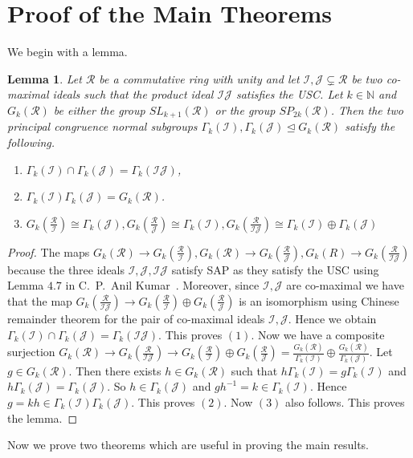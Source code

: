\documentclass[12pt]{amsart}
\newcommand{\sbnq}{\subsetneq}
\newcommand{\mbb}{\mathbb}
\newcommand{\mcl}{\mathcal}
\newcommand{\lra}{\longrightarrow}
\newcommand{\I}{\mcl I}
\newcommand{\N}{\mbb N}
\newcommand{\R}{\mcl R}
\theoremstyle{plain}
\newtheorem{lemma}[theorem]{Lemma}
\theoremstyle{definition}
\theoremstyle{remark}
\numberwithin{equation}{section}
\begin{document}
\section{\bf{Proof of the Main Theorems}}
We begin with a lemma.
\begin{lemma}
	\label{lemma:Complement}
Let $\R$ be a commutative ring with unity and let $\I,\mcl{J}\sbnq \R$ be two co-maximal ideals such that the product ideal $\I\mcl{J}$ satisfies the USC. Let $k\in \N$ and $G_k(\R)$ be either the group $SL_{k+1}(\R)$ or the group $SP_{2k}(\R)$. Then the two principal congruence normal subgroups $\Gamma_k(\I),\Gamma_k(\mcl{J}) \trianglelefteq  G_k(\R)$ satisfy the following.
\begin{enumerate}
\item $\Gamma_k(\I)\cap \Gamma_k(\mcl{J})=\Gamma_k(\I\mcl{J})$,
\item $\Gamma_k(\mcl{I})\Gamma_k(\mcl{J})=G_k(\R)$.
\item $G_k(\frac{\R}{\I})\cong \Gamma_k(\mcl{J}),G_k(\frac{\R}{\mcl{J}})\cong \Gamma_k(\I),G_k(\frac{\R}{\I\mcl{J}})\cong \Gamma_k(\I)\oplus \Gamma_k(\mcl{J})$
\end{enumerate}
\end{lemma}
\begin{proof}
The maps $G_k(\R)\lra G_k(\frac{\R}{\I}),G_k(\R)\lra G_k(\frac{\R}{\mcl{J}}),G_k(R)\lra G_k(\frac{\R}{\I\mcl{J}})$ because the three ideals $\I,\mcl{J},\I\mcl{J}$ satisfy SAP as they satisfy the USC using Lemma $4.7$ in C.~P.~Anil Kumar~\cite{CPAKII}. Moreover, since $\I,\mcl{J}$ are co-maximal we have that the map $G_k(\frac{\R}{\I\mcl{J}})\lra G_k(\frac{\R}{\mcl{I}})\oplus G_k(\frac{\R}{\mcl{J}})$ is an isomorphism using Chinese remainder theorem for the pair of co-maximal ideals $\I,\mcl{J}$. Hence we obtain $\Gamma_k(\I)\cap \Gamma_k(\mcl{J})=\Gamma_k(\I\mcl{J})$. This proves $(1)$. Now we have a composite surjection $G_k(\R)\lra G_k(\frac{\R}{\I\mcl{J}}) \lra G_k(\frac{\R}{\mcl{I}})\oplus G_k(\frac{\R}{\mcl{J}})=\frac{G_k(\R)}{\Gamma_k(\I)}\oplus \frac{G_k(\R)}{\Gamma_k(\mcl{J})}$. Let $g\in G_k(\R)$. Then there exists $h\in G_k(\R)$ such that $h\Gamma_k(\I)=g\Gamma_k(\I)$ and $h\Gamma_k(\mcl{J})=\Gamma_k(\mcl{J})$. So $h\in \Gamma_k(\mcl{J})$ and $gh^{-1}=k\in \Gamma_k(\I)$. Hence $g=kh\in \Gamma_k(\mcl{I})\Gamma_k(\mcl{J})$. This proves $(2)$. Now $(3)$ also follows. This proves the lemma.	
\end{proof}
Now we prove two theorems which are useful in proving the main results.
\end{document}
